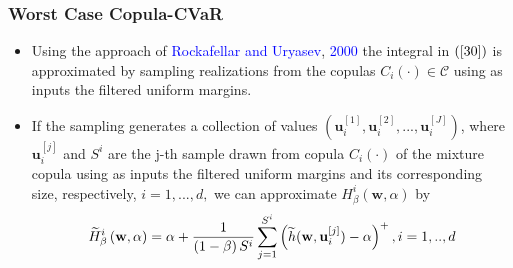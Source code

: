 \documentclass[pdf,10pt,xcolor=dvipsnames,hide notes]{beamer}
\begin{document}
\begin{frame}[label=frame3e]
	\frametitle{Worst Case Copula-CVaR}
	
	\begin{itemize}
		\justifying
		
		\item 	Using the approach of \textcolor{blue}{Rockafellar and Uryasev}, \textcolor{blue}{2000} the integral in $\left( \ref{30}\right) $ is approximated by sampling realizations from the copulas $%
		C_{i}\left( \cdot \right) \in \mathcal{C}$ using as inputs the filtered
		uniform margins. 
		
		\vspace{0.3cm}
		
		\item If the sampling generates a collection of values $\left(
		\mathbf{u}_{i}^{[1]},\mathbf{u}_{i}^{[2]},...,\mathbf{u}_{i}^{[J]}\right) $,
		where $\mathbf{u}_{i}^{[j]}$ and $S^{i}$ are the j-th sample drawn from
		copula $C_{i}\left( \cdot \right) $ of the mixture copula using as inputs
		the filtered uniform margins and its corresponding size, respectively, $%
		i=1,...,d,$ we can approximate $H_{\beta }^{i}\left( \mathbf{w},\alpha
		\right) $ by
		\begin{equation}
		\widetilde{H}_{\beta }^{i}\left( \mathbf{w},\alpha \right) =\alpha +\frac{1}{%
			\left( 1-\beta \right) S^{i}}\sum_{j=1}^{S^{i}}\left( \widetilde{h}(\mathbf{w},\mathbf{u}%
		_{i}^{[j]})-\alpha \right) ^{+},i=1,..,d
		\end{equation}%
		
				
	\end{itemize}
	
	
\end{frame}
\end{document}
